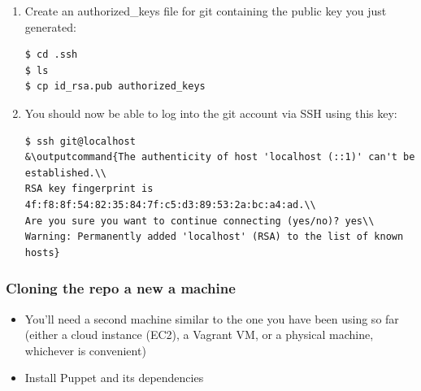 \documentclass{beamer}
\newcommand{\outputcommand}[1]{\color{darkgreen}{#1}}
\begin{document}
\begin{frame}
\begin{itemize}
\begin{enumerate}
\item Create an authorized\_keys file for git containing the public key you just generated:
\begin{lstlisting}[escapechar=&]
$ cd .ssh
$ ls
$ cp id_rsa.pub authorized_keys
\end{lstlisting}

\item You should now be able to log into the git account via SSH using this key:
\begin{lstlisting}[escapechar=&]
$ ssh git@localhost
&\outputcommand{The authenticity of host 'localhost (::1)' can't be established.\\
RSA key fingerprint is 4f:f8:8f:54:82:35:84:7f:c5:d3:89:53:2a:bc:a4:ad.\\
Are you sure you want to continue connecting (yes/no)? yes\\
Warning: Permanently added 'localhost' (RSA) to the list of known hosts}
\end{lstlisting}

\end{enumerate}
\end{itemize}


\end{frame}
\begin{frame}[fragile]
\frametitle{Cloning the repo a new a machine}
\begin{itemize}
\item You'll need a second machine similar to the one you have been using so far (either a cloud
instance (EC2), a Vagrant VM, or a physical machine, whichever is convenient)
\item Install Puppet and its dependencies
\end{itemize}

\end{frame}
\end{document}
